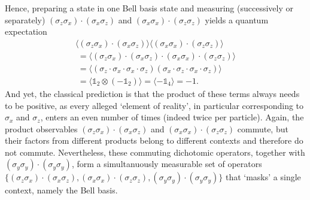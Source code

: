 \documentclass[
  twocolumn,
 showpacs,
 showkeys,
 preprintnumbers,
 amsmath,amssymb,
 aps,
 prl,
  longbibliography,
 floatfix,
 ]{revtex4-2}
\newcommand\myotimes{ }
\begin{document}
Hence, preparing a state in one Bell basis state and measuring (successively or separately)
$
(\sigma_z \myotimes \sigma_x) \cdot (\sigma_x \myotimes \sigma_z)
$
and
$
(\sigma_x \myotimes \sigma_x) \cdot (\sigma_z \myotimes \sigma_z)
$
yields a quantum expectation
\begin{equation}
\begin{split}
\langle
(\sigma_z \myotimes \sigma_x) \cdot (\sigma_x \myotimes \sigma_z)\rangle \langle  (\sigma_x \myotimes \sigma_x) \cdot (\sigma_z \myotimes \sigma_z) \rangle
\\
\;
=
\langle
(\sigma_z \myotimes \sigma_x) \cdot (\sigma_x \myotimes \sigma_z)   \cdot
(\sigma_x \myotimes \sigma_x) \cdot (\sigma_z \myotimes \sigma_z) \rangle
\\
\;
=
 \langle
(\sigma_z  \cdot \sigma_x \cdot \sigma_x \cdot \sigma_z ) \myotimes (\sigma_x \cdot \sigma_z \cdot  \sigma_x \cdot \sigma_z)
 \rangle
\\
\;
=
\langle
\mathbb{1}_2 \otimes (-\mathbb{1}_2)
 \rangle
=
\langle
-\mathbb{1}_4
 \rangle
= -1.
\end{split}
\end{equation}
And yet, the classical prediction is that the product of these terms always needs to be positive,
as every alleged `element of reality', in particular corresponding to $\sigma_x$ and $\sigma_z$, enters an even number of times (indeed twice per particle).
Again, the product observables
 $(\sigma_z \myotimes \sigma_x) \cdot (\sigma_x \myotimes \sigma_z)$
and
$(\sigma_x \myotimes \sigma_x) \cdot (\sigma_z \myotimes \sigma_z)$
 commute, but their factors from different products belong to different contexts and therefore do not commute.
Nevertheless, these commuting dichotomic operators, together with $(\sigma_y \myotimes \sigma_y) \cdot (\sigma_y \myotimes \sigma_y)$,
form a simultanuously measurable set of operators
$\{
(\sigma_z \myotimes \sigma_x) \cdot (\sigma_x \myotimes \sigma_z),
     (\sigma_x \myotimes \sigma_x) \cdot (\sigma_z \myotimes \sigma_z),
     (\sigma_y \myotimes \sigma_y) \cdot (\sigma_y \myotimes \sigma_y)
\}$
that `masks' a single context, namely the Bell basis.
\end{document}
